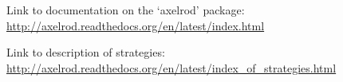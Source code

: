 \label{app:axelrod2015library}
Link to documentation on the `axelrod' package:
\url{http://axelrod.readthedocs.org/en/latest/index.html}

Link to description of strategies:
\url{http://axelrod.readthedocs.org/en/latest/index_of_strategies.html}